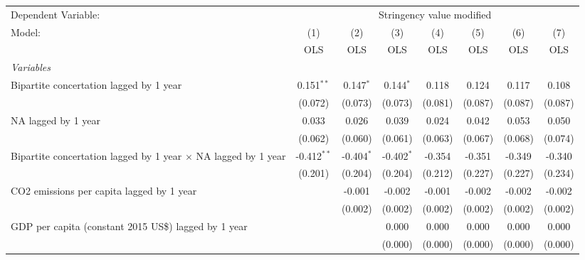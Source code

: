 
\begingroup
\centering
\begin{tabular}{lccccccc}
   \toprule
   Dependent Variable: & \multicolumn{7}{c}{Stringency value modified}\\
   Model:                                                                & (1)           & (2)          & (3)          & (4)     & (5)     & (6)     & (7)\\  
                                                                         &  OLS          & OLS          & OLS          & OLS     & OLS     & OLS     & OLS\\  
   \midrule
   \emph{Variables}\\
   Bipartite concertation lagged by 1 year                               & 0.151$^{**}$  & 0.147$^{*}$  & 0.144$^{*}$  & 0.118   & 0.124   & 0.117   & 0.108\\   
                                                                         & (0.072)       & (0.073)      & (0.073)      & (0.081) & (0.087) & (0.087) & (0.087)\\   
   NA lagged by 1 year                                                   & 0.033         & 0.026        & 0.039        & 0.024   & 0.042   & 0.053   & 0.050\\   
                                                                         & (0.062)       & (0.060)      & (0.061)      & (0.063) & (0.067) & (0.068) & (0.074)\\   
   Bipartite concertation lagged by 1 year $\times$ NA lagged by 1 year  & -0.412$^{**}$ & -0.404$^{*}$ & -0.402$^{*}$ & -0.354  & -0.351  & -0.349  & -0.340\\   
                                                                         & (0.201)       & (0.204)      & (0.204)      & (0.212) & (0.227) & (0.227) & (0.234)\\   
   CO2 emissions per capita lagged by 1 year                             &               & -0.001       & -0.002       & -0.001  & -0.002  & -0.002  & -0.002\\   
                                                                         &               & (0.002)      & (0.002)      & (0.002) & (0.002) & (0.002) & (0.002)\\   
   GDP per capita (constant 2015 US\$) lagged by 1 year                  &               &              & 0.000        & 0.000   & 0.000   & 0.000   & 0.000\\   
                                                                         &               &              & (0.000)      & (0.000) & (0.000) & (0.000) & (0.000)\\   

\end{tabular}
